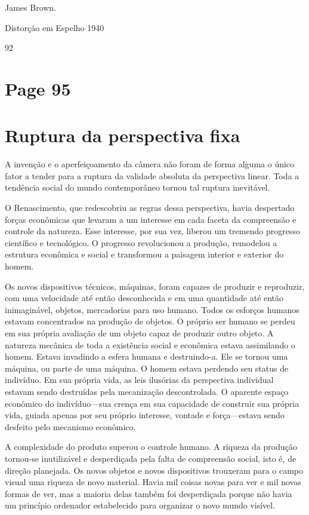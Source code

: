 \documentclass[a4paper]{article}
\begin{document}
\vfill %

James Brown.\par
Distorção em Espelho 1940

\bigskip %

92

\newpage
\section*{Page 95}

\section*{Ruptura da perspectiva fixa}

A invenção e o aperfeiçoamento da câmera não foram de forma alguma o único fator a tender para a ruptura da validade absoluta da perspectiva linear. Toda a tendência social do mundo contemporâneo tornou tal ruptura inevitável.

O Renascimento, que redescobriu as regras dessa perspectiva, havia despertado forças econômicas que levaram a um interesse em cada faceta da compreensão e controle da natureza. Esse interesse, por sua vez, liberou um tremendo progresso científico e tecnológico. O progresso revolucionou a produção, remodelou a estrutura econômica e social e transformou a paisagem interior e exterior do homem.

Os novos dispositivos técnicos, máquinas, foram capazes de produzir e reproduzir, com uma velocidade até então desconhecida e em uma quantidade até então inimaginável, objetos, mercadorias para uso humano. Todos os esforços humanos estavam concentrados na produção de objetos. O próprio ser humano se perdeu em sua própria avaliação de um objeto capaz de produzir outro objeto. A natureza mecânica de toda a existência social e econômica estava assimilando o homem. Estava invadindo a esfera humana e destruindo-a. Ele se tornou uma máquina, ou parte de uma máquina. O homem estava perdendo seu status de indivíduo. Em sua própria vida, as leis ilusórias da perspectiva individual estavam sendo destruídas pela mecanização descontrolada. O aparente espaço econômico do indivíduo---sua crença em sua capacidade de construir sua própria vida, guiada apenas por seu próprio interesse, vontade e força---estava sendo desfeito pelo mecanismo econômico.

A complexidade do produto superou o controle humano. A riqueza da produção tornou-se inutilizável e desperdiçada pela falta de compreensão social, isto é, de direção planejada. Os novos objetos e novos dispositivos trouxeram para o campo visual uma riqueza de novo material. Havia mil coisas novas para ver e mil novas formas de ver, mas a maioria delas também foi desperdiçada porque não havia um princípio ordenador estabelecido para organizar o novo mundo visível.
\end{document}
